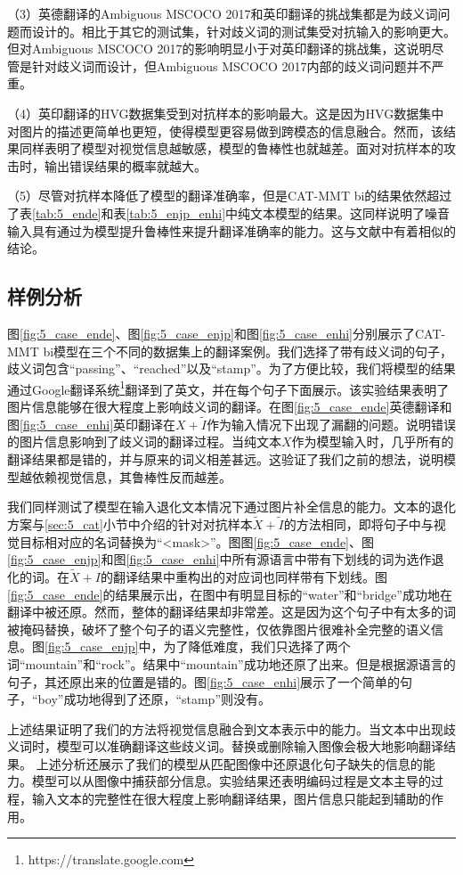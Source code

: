 （3）英德翻译的Ambiguous MSCOCO 2017和英印翻译的挑战集都是为歧义词问题而设计的。相比于其它的测试集，针对歧义词的测试集受对抗输入的影响更大。但对Ambiguous MSCOCO 2017的影响明显小于对英印翻译的挑战集，这说明尽管是针对歧义词而设计，但Ambiguous MSCOCO 2017内部的歧义词问题并不严重。

（4）英印翻译的HVG数据集受到对抗样本的影响最大。这是因为HVG数据集中对图片的描述更简单也更短，使得模型更容易做到跨模态的信息融合。然而，该结果同样表明了模型对视觉信息越敏感，模型的鲁棒性也就越差。面对对抗样本的攻击时，输出错误结果的概率就越大。

（5）尽管对抗样本降低了模型的翻译准确率，但是CAT-MMT bi的结果依然超过了表\ref{tab:5_ende}和表\ref{tab:5_enjp_enhi}中纯文本模型的结果。这同样说明了噪音输入具有通过为模型提升鲁棒性来提升翻译准确率的能力。这与文献\cite{23_elliott-2018-adversarial,22_li-etal-2021-vision,20_wu-etal-2021-good}中有着相似的结论。


\subsection{样例分析}
图\ref{fig:5_case_ende}、图\ref{fig:5_case_enjp}和图\ref{fig:5_case_enhi}分别展示了CAT-MMT bi模型在三个不同的数据集上的翻译案例。我们选择了带有歧义词的句子，歧义词包含“passing”、“reached”以及“stamp”。为了方便比较，我们将模型的结果通过Google翻译系统\footnote{https://translate.google.com}翻译到了英文，并在每个句子下面展示。该实验结果表明了图片信息能够在很大程度上影响歧义词的翻译。在图\ref{fig:5_case_ende}英德翻译和图\ref{fig:5_case_enhi}英印翻译在$X+\tilde{I}$作为输入情况下出现了漏翻的问题。说明错误的图片信息影响到了歧义词的翻译过程。当纯文本$X$作为模型输入时，几乎所有的翻译结果都是错的，并与原来的词义相差甚远。这验证了我们之前的想法，说明模型越依赖视觉信息，其鲁棒性反而越差。




我们同样测试了模型在输入退化文本情况下通过图片补全信息的能力。文本的退化方案与\ref{sec:5_cat}小节中介绍的针对对抗样本$\tilde{X}+\tilde{I}$的方法相同，即将句子中与视觉目标相对应的名词替换为“<mask>”。图图\ref{fig:5_case_ende}、图\ref{fig:5_case_enjp}和图\ref{fig:5_case_enhi}中所有源语言中带有下划线的词为选作退化的词。在$\tilde{X}+I$的翻译结果中重构出的对应词也同样带有下划线。图\ref{fig:5_case_ende}的结果展示出，在图中有明显目标的“water”和“bridge”成功地在翻译中被还原。然而，整体的翻译结果却非常差。这是因为这个句子中有太多的词被掩码替换，破坏了整个句子的语义完整性，仅依靠图片很难补全完整的语义信息。图\ref{fig:5_case_enjp}中，为了降低难度，我们只选择了两个词“mountain”和“rock”。结果中“mountain”成功地还原了出来。但是根据源语言的句子，其还原出来的位置是错的。图\ref{fig:5_case_enhi}展示了一个简单的句子，“boy”成功地得到了还原，“stamp”则没有。

上述结果证明了我们的方法将视觉信息融合到文本表示中的能力。当文本中出现歧义词时，模型可以准确翻译这些歧义词。替换或删除输入图像会极大地影响翻译结果。
上述分析还展示了我们的模型从匹配图像中还原退化句子缺失的信息的能力。模型可以从图像中捕获部分信息。实验结果还表明编码过程是文本主导的过程，输入文本的完整性在很大程度上影响翻译结果，图片信息只能起到辅助的作用。